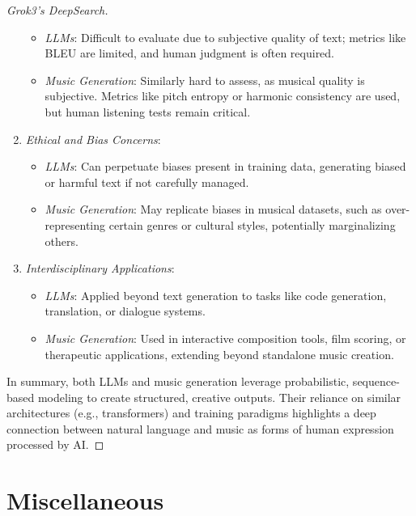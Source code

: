\documentclass{article}
\begin{document}
\begin{proof}[Grok3's DeepSearch]
\begin{enumerate}
\begin{itemize}
			\item {\it LLMs}: Difficult to evaluate due to subjective quality of text; metrics like BLEU are limited, and human judgment is often required.
			\item {\it Music Generation}: Similarly hard to assess, as musical quality is subjective. Metrics like pitch entropy or harmonic consistency are used, but human listening tests remain critical.
		\end{itemize}
		\item {\it Ethical and Bias Concerns}:
		\begin{itemize}
			\item {\it LLMs}: Can perpetuate biases present in training data, generating biased or harmful text if not carefully managed.
			\item {\it Music Generation}: May replicate biases in musical datasets, such as over-representing certain genres or cultural styles, potentially marginalizing others.
		\end{itemize}
		\item {\it Interdisciplinary Applications}:
		\begin{itemize}
			\item {\it LLMs}: Applied beyond text generation to tasks like code generation, translation, or dialogue systems.
			\item {\it Music Generation}: Used in interactive composition tools, film scoring, or therapeutic applications, extending beyond standalone music creation.
		\end{itemize}
	\end{enumerate}
	In summary, both LLMs and music generation leverage probabilistic, sequence-based modeling to create structured, creative outputs. Their reliance on similar architectures (e.g., transformers) and training paradigms highlights a deep connection between natural language and music as forms of human expression processed by AI.
\end{proof}


\section{Miscellaneous}


\printbibliography[heading=bibintoc]
	
\end{document}
